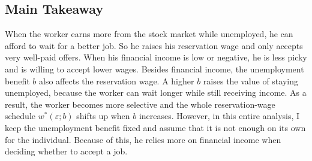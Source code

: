 \documentclass{article}
\begin{document}
	\subsection*{Main Takeaway}
	When the worker earns more from the stock market while unemployed, he can afford to wait for a better job. So he raises his reservation wage and only accepts very well-paid offers. When his financial income is low or negative, he is less picky and is willing to accept lower wages. Besides financial income, the unemployment benefit $b$ also affects the reservation wage. A higher $b$ raises the value of staying unemployed, because the worker can wait longer while still receiving income. As a result, the worker becomes more selective and the whole reservation-wage schedule $w^*(\varepsilon; b)$ shifts up when $b$ increases. However, in this entire analysis, I keep the unemployment benefit fixed and assume that it is not enough on its own for the individual. Because of this, he relies more on financial income when deciding whether to accept a job.
	
	
\end{document}
